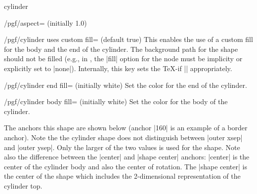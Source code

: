\begin{shape}{cylinder}
\begin{key}{/pgf/aspect= (initially 1.0)}
\end{key}

\begin{key}{/pgf/cylinder uses custom fill= (default true)}
	This enables the use of a custom fill for the body and the end of 
	the cylinder. The background path for the shape should not be 
	filled (e.g., in \tikzname{}, the |fill| option for the node must 
	be implicity or explicitly set to |none|).
  Internally, this key sets the \TeX-if 
  |\ifpgfcylinderusescustomfill| appropriately.
\end{key}

\begin{codeexample}[]
\end{codeexample}

\begin{key}{/pgf/cylinder end fill= (initially white)}
	Set the color for the end of the cylinder.
\end{key}
\begin{key}{/pgf/cylinder body fill= (initially white)}
	Set the color for the body of the cylinder.
\end{key}


  The anchors this shape are shown below (anchor |160| is an
	example of a border anchor). Note the the cylinder shape does not 
	distinguish between |outer xsep| and |outer ysep|. Only the larger 
	of the two values is used for the shape. Note also the difference 
	between the |center| and |shape center| anchors: |center| is the
	center of the cylinder body and also the center of rotation. 
	The |shape center| is the center of the shape which includes the 
	2-dimensional representation of the cylinder top.	
	 

\begin{codeexample}[]
\Huge
{}
\end{codeexample}  


\end{shape}






